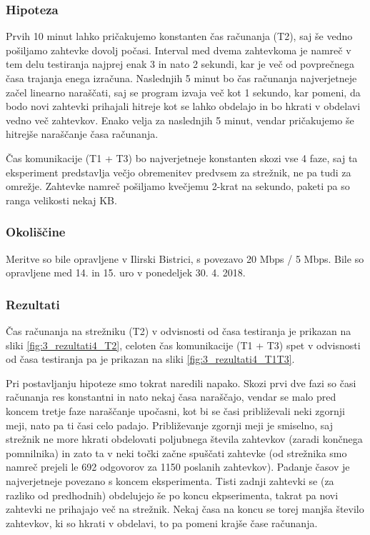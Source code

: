 \subsubsection{Hipoteza}

Prvih 10 minut lahko pričakujemo konstanten čas računanja (T2), saj še vedno pošiljamo zahtevke dovolj počasi.
Interval med dvema zahtevkoma je namreč v tem delu testiranja najprej enak 3 in nato 2 sekundi, kar je več od povprečnega časa trajanja enega izračuna.
Naslednjih 5 minut bo čas računanja najverjetneje začel linearno naraščati, saj se program izvaja več kot 1 sekundo, kar pomeni, da bodo novi zahtevki prihajali hitreje kot se lahko obdelajo in bo hkrati v obdelavi vedno več zahtevkov.
Enako velja za naslednjih 5 minut, vendar pričakujemo še hitrejše naraščanje časa računanja.

Čas komunikacije (T1 + T3) bo najverjetneje konstanten skozi vse 4 faze, saj ta eksperiment predstavlja večjo obremenitev predvsem za strežnik, ne pa tudi za omrežje.
Zahtevke namreč pošiljamo kvečjemu 2-krat na sekundo, paketi pa so ranga velikosti nekaj KB.

\subsubsection{Okoliščine}

Meritve so bile opravljene v Ilirski Bistrici, s povezavo 20 Mbps / 5 Mbps.
Bile so opravljene med 14. in 15. uro v ponedeljek 30. 4. 2018.

\subsubsection{Rezultati}

Čas računanja na strežniku (T2) v odvisnosti od časa testiranja je prikazan na sliki \ref{fig:3_rezultati4_T2}, celoten čas komunikacije (T1 + T3) spet v odvisnosti od časa testiranja pa je prikazan na sliki \ref{fig:3_rezultati4_T1T3}.

Pri postavljanju hipoteze smo tokrat naredili napako.
Skozi prvi dve fazi so časi računanja res konstantni in nato nekaj časa naraščajo, vendar se malo pred koncem tretje faze naraščanje upočasni, kot bi se časi približevali neki zgornji meji, nato pa ti časi celo padajo.
Približevanje zgornji meji je smiselno, saj strežnik ne more hkrati obdelovati poljubnega števila zahtevkov (zaradi končnega pomnilnika) in zato ta v neki točki začne spuščati zahtevke (od strežnika smo namreč prejeli le 692 odgovorov za 1150 poslanih zahtevkov).
Padanje časov je najverjetneje povezano s koncem eksperimenta.
Tisti zadnji zahtevki se (za razliko od predhodnih) obdelujejo še po koncu ekpserimenta, takrat pa novi zahtevki ne prihajajo več na strežnik.
Nekaj časa na koncu se torej manjša število zahtevkov, ki so hkrati v obdelavi, to pa pomeni krajše čase računanja.

